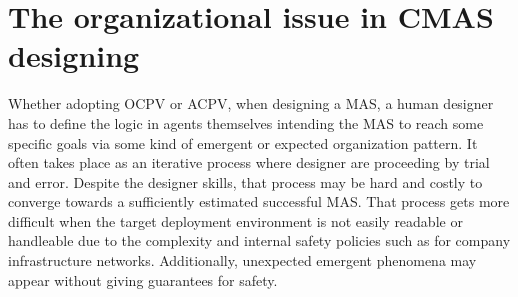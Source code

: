 \documentclass[runningheads]{llncs}
\begin{document}
\section{The organizational issue in CMAS designing}







Whether adopting OCPV or ACPV, when designing a MAS, a human designer has to define the logic in agents themselves intending the MAS to reach some specific goals via some kind of emergent or expected organization pattern. It often takes place as an iterative process where designer are proceeding by trial and error. Despite the designer skills, that process may be hard and costly to converge towards a sufficiently estimated successful MAS. That process gets more difficult when the target deployment environment is not easily readable or handleable due to the complexity and internal safety policies such as for company infrastructure networks. Additionally, unexpected emergent phenomena may appear without giving guarantees for safety.
\end{document}
